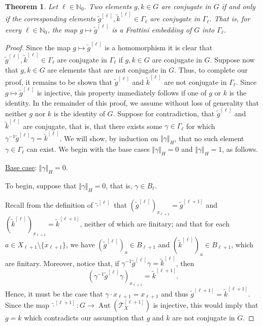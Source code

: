 \documentclass[a4paper]{amsart}
\numberwithin{equation}{section}
\newtheorem{theorem}{Theorem}[section]
\theoremstyle{definition}
\theoremstyle{remark}
\newcommand{\N}{\mathbb{N}}
\DeclareMathOperator{\Aut}{Aut}
\newcommand{\absH}[1]{\Vert #1 \Vert_H}
\newcommand{\T}{\mathcal{T}}
\begin{document}
\begin{theorem}\label{thm:fratini-embedding}
Let $\ell \in \N_0$.
Two elements $g,k \in G$ are conjugate in $G$ if and only if the corresponding elements $\widetilde{g}^{[\ell]},\widetilde{k}^{[\ell]}\in \Gamma_\ell$ are conjugate in $\Gamma_\ell$.
  That is, for every $\ell\in \N_0$, the map $g\mapsto \widetilde{g}^{[\ell]}$ is a Frattini embedding of $G$ into $\Gamma_\ell$.
\end{theorem}

\begin{proof}
Since the map $g\mapsto \widetilde{g}^{[\ell]}$ is a homomorphism it is clear that $\widetilde{g}^{[\ell]},\widetilde{k}^{[\ell]}\in \Gamma_\ell$ are conjugate in $\Gamma_\ell$ if $g,k \in G$ are conjugate in $G$.
Suppose now that $g,k\in G$ are elements that are not conjugate in $G$.
Thus, to complete our proof, it remains to be shown that $\widetilde{g}^{[\ell]}$ and $\widetilde{k}^{[\ell]}$ are not conjugate in $\Gamma_\ell$.
Since $g\mapsto \widetilde{g}^{[\ell]}$ is injective, this property immediately follows if one of $g$ or $k$ is the identity.
In the remainder of this proof, we assume without loss of generality that neither $g$ nor $k$ is the identity of $G$.			 
Suppose for contradiction, that $\widetilde{g}^{[\ell]}$ and $\widetilde{k}^{[\ell]}$ are conjugate, that is, that there exists some $\gamma\in \Gamma_\ell$ for which $\gamma^{-1} \widetilde{g}^{[\ell]} \gamma = \widetilde{k}^{[\ell]}$.
We will show, by induction on $\absH{\gamma}$, that no such element $\gamma\in \Gamma_\ell$ can exist.
We begin with the base cases $\absH{\gamma} = 0$ and $\absH{\gamma}=1$, as follows.

\medskip

\noindent\underline{Base case}: $\absH{\gamma} = 0$.
\nopagebreak

\nopagebreak\smallskip
\nopagebreak\noindent
To begin, suppose that $\absH{\gamma}=0$, that is, $\gamma\in B_\ell$.

Recall from the definition of $\widetilde{\cdot}^{[\ell]}$ that
$(\widetilde{g}^{[\ell]})_{x_{\ell+1}} = \widetilde{g}^{[\ell+1]}$ and
$(\widetilde{k}^{[\ell]})_{x_{\ell+1}} = \widetilde{k}^{[\ell+1]}$, neither of which are finitary;
and that for each $a\in X_{\ell+1}\setminus\{x_{\ell+1}\}$, we have $(\widetilde{g}^{[\ell]})_{a} \in B_{\ell+1}$ and
$(\widetilde{k}^{[\ell]})_{a} \in B_{\ell+1}$, which are finitary.
Moreover, notice that, if $\gamma^{-1} \widetilde{g}^{[\ell]} \gamma = \widetilde{k}^{[\ell]}$, then
\[
(\gamma^{-1} \widetilde{g}^{[\ell]} \gamma)_{x_{\ell+1}}
= \widetilde{k}^{[\ell+1]}.
\]
Hence, it must be the case that $\gamma\cdot x_{\ell+1}=x_{\ell+1}$ and thus $\widetilde{g}^{[\ell+1]} = \widetilde{k}^{[\ell+1]}$.
Since the map $\widetilde{\cdot}^{[\ell+1]} \colon G \to \Aut(\T_X^{[\ell+1]})$ is injective, this would imply that $g=k$ which contradicts our assumption that $g$ and $k$ are not conjugate in $G$.


\end{proof}
\end{document}
